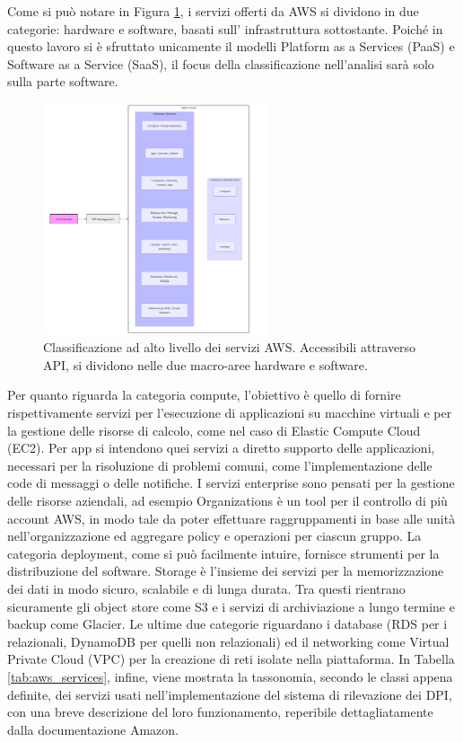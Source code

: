 Come si può notare in Figura \ref{fig:services_taxonomy}, i servizi offerti da AWS si dividono in due categorie: hardware e software, basati sull' infrastruttura sottostante\cite{b12AWSinAction}. Poiché in questo lavoro si è sfruttato unicamente il modelli Platform as a Services (PaaS) e Software as a Service (SaaS), 
il focus della classificazione nell'analisi sarà solo sulla parte software.
\begin{figure}[htbp]
    \centering
    \includegraphics[width=0.59\textwidth]{figures/aws_services_taxonomy.png}
    \caption{Classificazione ad alto livello dei servizi AWS. Accessibili attraverso API, si dividono nelle due macro-aree hardware e software.}
    \label{fig:services_taxonomy}
\end{figure}

Per quanto riguarda la categoria compute, l'obiettivo è quello di fornire rispettivamente servizi per l'esecuzione di applicazioni su macchine virtuali e per la gestione delle risorse di calcolo, come nel caso di Elastic Compute Cloud (EC2). Per app si intendono quei servizi a diretto supporto delle applicazioni, necessari per la risoluzione di problemi comuni, come l'implementazione delle code di messaggi o delle notifiche. I servizi enterprise sono pensati per la gestione delle risorse aziendali, ad esempio Organizations è un tool per il controllo di più account AWS, in modo tale da poter effettuare raggruppamenti in base alle unità nell'organizzazione ed aggregare policy e operazioni per ciascun gruppo. La categoria deployment, come si può facilmente intuire, fornisce strumenti per la distribuzione del software. Storage è l'insieme dei servizi per la memorizzazione dei dati in modo sicuro, scalabile e di lunga durata. Tra questi rientrano sicuramente gli object store come S3 e i servizi di archiviazione a lungo termine e backup come Glacier. Le ultime due categorie riguardano i database (RDS per i relazionali, DynamoDB per quelli non relazionali) ed il networking come Virtual Private Cloud (VPC) per la creazione di reti isolate nella piattaforma. %
In Tabella \ref{tab:aws_services}, infine, viene mostrata la tassonomia, secondo le classi appena definite, dei servizi usati nell'implementazione del sistema di rilevazione dei DPI, con una breve descrizione del loro funzionamento, reperibile dettagliatamente dalla documentazione Amazon\cite{b13AWSDoc}. 

